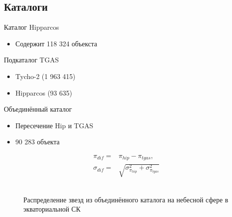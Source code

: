 \documentclass[12pt,aspectratio=43]{beamer}
\begin{document}
\subsection{Каталоги}
\begin{frame}%
\begin{block}{Каталог Hipparcos}
\begin{itemize}
  \item Содержит 118 324 объекста
  \end{itemize}
\end{block}  

\begin{block}{Подкаталог TGAS}
\begin{itemize}
  \item Tycho-2 (1 963 415)
  \item Hipparcos (93 635)
  \end{itemize}
\end{block}  
\begin{block}{Объединённый каталог}
\begin{itemize}
  \item Пересечение Hip и TGAS
  \item 90 283 объекта
  \end{itemize}
\end{block}  
\begin{equation}\label{f:prlx} 
\begin{array}{rl}
\pi_{dif} = &\pi_{hip} - \pi_{tgas},\\
\sigma_{dif} = &\sqrt{\sigma^2_{\pi_{hip}} + \sigma^2_{\pi_{tgas}}}
\end{array}
\end{equation}
\end{frame}	


\begin{frame}%
\begin{figure}[h!]
\\{Распределение звезд из объединённого каталога на небесной сфере в экваториальной СК}
\end{figure}
\end{frame}	
\end{document}
